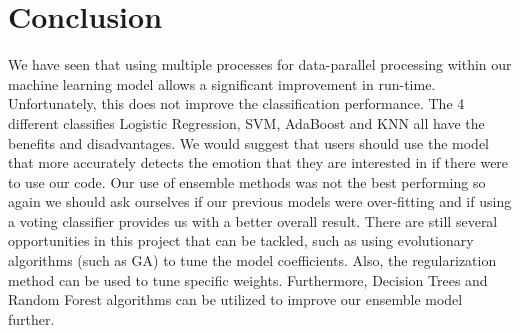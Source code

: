 \section{Conclusion}
\label{sec:conclusion}
We have seen that using multiple processes
for data-parallel processing within our machine learning model allows a significant improvement in run-time.
Unfortunately, this does not improve the classification performance.
The 4 different classifies Logistic Regression,
SVM, AdaBoost and KNN
all have the benefits and disadvantages.
We would suggest that users should use the model that more accurately detects
the emotion that they are interested in if there were to use our code.
Our use of ensemble methods was not the best performing so again we should
ask ourselves if our previous models were over-fitting and if using a voting
classifier provides us with a better overall result. 
There are still several opportunities in this project that can be tackled, 
such as using evolutionary algorithms (such as GA) to tune the model coefficients. 
Also, the regularization method can be used to tune specific weights. 
Furthermore, Decision Trees and Random Forest algorithms can be utilized to 
improve our ensemble model further.